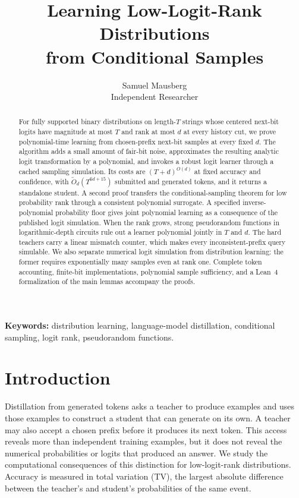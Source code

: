 \documentclass[11pt]{article}
\title{\bfseries Learning Low-Logit-Rank Distributions\\from Conditional Samples}
\author{Samuel Mausberg\\[3pt]\normalsize Independent Researcher}
\date{}
\theoremstyle{definition}
\theoremstyle{remark}
\begin{document}
\maketitle
\begin{abstract}
For fully supported binary distributions on length-$T$ strings whose centered next-bit logits have magnitude at most $T$ and rank at most $d$ at every history cut, we prove polynomial-time learning from chosen-prefix next-bit samples at every fixed $d$. The algorithm adds a small amount of fair-bit noise, approximates the resulting analytic logit transformation by a polynomial, and invokes a robust logit learner through a cached sampling simulation. Its costs are $(T+d)^{O(d)}$ at fixed accuracy and confidence, with $\widetilde O_d(T^{6d+15})$ submitted and generated tokens, and it returns a standalone student. A second proof transfers the conditional-sampling theorem for low probability rank through a consistent polynomial surrogate. A specified inverse-polynomial probability floor gives joint polynomial learning as a consequence of the published logit simulation. When the rank grows, strong pseudorandom functions in logarithmic-depth circuits rule out a learner polynomial jointly in $T$ and $d$. The hard teachers carry a linear mismatch counter, which makes every inconsistent-prefix query simulable. We also separate numerical logit simulation from distribution learning: the former requires exponentially many samples even at rank one. Complete token accounting, finite-bit implementations, polynomial sample sufficiency, and a Lean~4 formalization of the main lemmas accompany the proofs.
\end{abstract}

\noindent\textbf{Keywords:} distribution learning, language-model distillation, conditional sampling, logit rank, pseudorandom functions.



\section{Introduction}

Distillation from generated tokens asks a teacher to produce examples and uses those examples to construct a student that can generate on its own. A teacher may also accept a chosen prefix before it produces its next token. This access reveals more than independent training examples, but it does not reveal the numerical probabilities or logits that produced an answer. We study the computational consequences of this distinction for low-logit-rank distributions. Accuracy is measured in total variation (TV), the largest absolute difference between the teacher's and student's probabilities of the same event.
\end{document}
